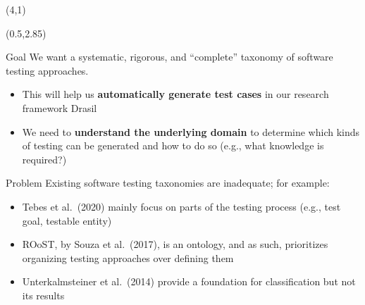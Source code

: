 \documentclass[22pt]{beamer}
\begin{document}
\begin{frame}[fragile]
    \begin{textblock}{8}(4,1)
        \titlepage
    \end{textblock}

    \begin{textblock}{7.25}(0.5,2.85)

        \begin{block}{\fontsize{37}{20}\selectfont Goal}
            We want a systematic, rigorous, and ``complete'' taxonomy of
            software testing approaches.
            \begin{itemize}
                \item This will help us \textbf{automatically generate test cases}
                      in our research framework Drasil \cite{carette_drasil_2021}
                \item We need to \textbf{understand the underlying domain} to
                      determine which kinds of testing can be generated
                      and how to do so (e.g., what knowledge is required?)
            \end{itemize}

            \vspace{5mm}
        \end{block}

        \begin{block}{\fontsize{37}{20}\selectfont Problem}
            Existing software testing taxonomies are inadequate; for example:
            \begin{itemize}
                \item Tebes et al.~(2020) mainly focus on parts of the
                      testing process (e.g., test goal, testable entity)
                \item ROoST, by Souza et al.~(2017), is an ontology, and as
                      such, prioritizes organizing testing approaches over
                      defining them
                \item Unterkalmsteiner et al.~(2014) provide a foundation for
                      classification but not its results
            \end{itemize}
            \vspace{5mm}
        \end{block}


\end{textblock}
\end{frame}
\end{document}
